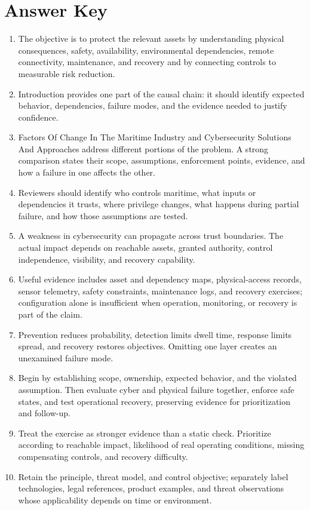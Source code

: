 \documentclass[11pt]{article}
\begin{document}
\section*{Answer Key}
\begin{enumerate}
\item The objective is to protect the relevant assets by understanding physical consequences, safety, availability, environmental dependencies, remote connectivity, maintenance, and recovery and by connecting controls to measurable risk reduction.
\item Introduction provides one part of the causal chain: it should identify expected behavior, dependencies, failure modes, and the evidence needed to justify confidence.
\item Factors Of Change In The Maritime Industry and Cybersecurity Solutions And Approaches address different portions of the problem. A strong comparison states their scope, assumptions, enforcement points, evidence, and how a failure in one affects the other.
\item Reviewers should identify who controls maritime, what inputs or dependencies it trusts, where privilege changes, what happens during partial failure, and how those assumptions are tested.
\item A weakness in cybersecurity can propagate across trust boundaries. The actual impact depends on reachable assets, granted authority, control independence, visibility, and recovery capability.
\item Useful evidence includes asset and dependency maps, physical-access records, sensor telemetry, safety constraints, maintenance logs, and recovery exercises; configuration alone is insufficient when operation, monitoring, or recovery is part of the claim.
\item Prevention reduces probability, detection limits dwell time, response limits spread, and recovery restores objectives. Omitting one layer creates an unexamined failure mode.
\item Begin by establishing scope, ownership, expected behavior, and the violated assumption. Then evaluate cyber and physical failure together, enforce safe states, and test operational recovery, preserving evidence for prioritization and follow-up.
\item Treat the exercise as stronger evidence than a static check. Prioritize according to reachable impact, likelihood of real operating conditions, missing compensating controls, and recovery difficulty.
\item Retain the principle, threat model, and control objective; separately label technologies, legal references, product examples, and threat observations whose applicability depends on time or environment.
\end{enumerate}
\end{document}
